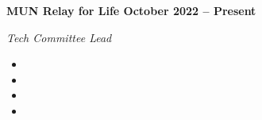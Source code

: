 \vspace{0.1cm}
\textbf{MUN Relay for Life \hfill October 2022 -- Present} \par
\textit{Tech Committee Lead} \par
\begin{itemize}
	\item
  \item 
  \item 
  \item 
\end{itemize} \par